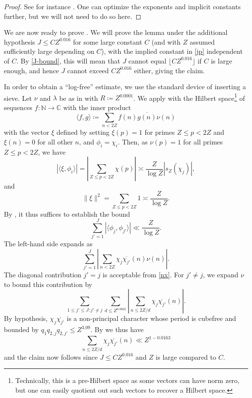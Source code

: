 \documentclass[12pt]{amsart}
\newcommand{\C}{\mathbb{C}}
\newcommand{\N}{\mathbb{N}}
\begin{document}
\begin{proof} See for instance \cite[Lemma 6.3]{ik}.  One can optimize the exponents and implicit constants further, but we will not need to do so here.
\end{proof}

We are now ready to prove .  We will prove the lemma under the additional hypothesis $J \leq C Z^{0.016}$ for some large constant $C$ (and with $Z$ assumed sufficiently large depending on $C$), with the implied constant in \eqref{jp} independent of $C$. By \eqref{J-bound}, this will mean that $J$ cannot equal $\lfloor C Z^{0.016} \rfloor$ if $C$ is large enough, and hence $J$ cannot exceed $C Z^{0.016}$ either, giving the claim.

In order to obtain a ``log-free'' estimate, we use the standard device of inserting a sieve.
Let $\nu$ and $\lambda$ be as in  with $R \coloneqq Z^{0.0001}$.  We apply  with the Hilbert space\footnote{Technically, this is a pre-Hilbert space as some vectors can have norm zero, but one can easily quotient out such vectors to recover a Hilbert space.} of sequences $f \colon \N \to \C$ with the inner product
$$ \langle f, g \rangle \coloneqq \sum_{n < 2Z} f(n) \overline{g(n)} \nu(n)$$
with the vector $\xi$ defined by setting $\xi(p)=1$ for primes $Z \leq p < 2Z$ and $\xi(n)=0$ for all other $n$, and $\phi_i = \chi_i$.
Then, as $\nu(p)=1$ for all primes $Z \leq p < 2Z$, we have
$$ |\langle \xi, \phi_i \rangle| = \left|\sum_{Z \leq p < 2Z} \chi(p)\right| \asymp \frac{Z}{\log Z} |s_Z(\chi_j)|,$$
and
$$ \|\xi\|^2 = \sum_{Z \leq p < 2Z} 1 \asymp \frac{Z}{\log Z}.$$
By , it thus suffices to establish the bound
$$ \sum_{j'=1}^J |\langle \phi_j, \phi_{j'}\rangle| \ll \frac{Z}{\log Z}.$$
The left-hand side expands as
$$ \sum_{j'=1}^J \left|\sum_{n < 2Z} \chi_j \overline{\chi_{j'}}(n) \nu(n)\right|.$$
The diagonal contribution $j'=j$ is acceptable from \eqref{nx}.  For $j' \neq j$, we expand $\nu$ to bound this contribution by
$$ \sum_{1 \leq j' \leq J: j' \neq j} \sum_{d \leq Z^{0.0001}} \left|\sum_{n \leq 2Z/d} \chi_j \overline{\chi_{j'}}(n)\right|.$$
By hypothesis, $\chi_j \overline{\chi_{j'}}$ is a non-principal character whose period is cubefree and bounded by $q_1 q_{2,j} q_{2,j'} \leq Z^{3.09}$.  By  we thus have
$$\sum_{n \leq 2Z/d} \chi_j \overline{\chi_{j'}}(n) \ll Z^{1-0.0163}$$
and the claim now follows since $J \leq C Z^{0.016}$ and $Z$ is large compared to $C$.
\end{document}
